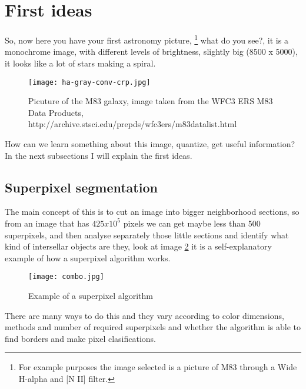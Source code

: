 \documentclass[11pt,fleqn]{book} %
\begin{document}
\section{First ideas}
So, now here you have your first astronomy picture, \footnote{For example purposes the image selected is a picture of M83 through a Wide H-alpha and [N II] filter. } what do you see?, it is a monochrome image, with different levels of brightness, slightly big (8500 x 5000), it looks like a lot of stars making a spiral.
\begin{figure}[h]
    \centering
        \texttt{[image: ha-gray-conv-crp.jpg]}
	    \caption{Picuture of the M83 galaxy, image taken from the WFC3 ERS M83 Data Products, http://archive.stsci.edu/prepds/wfc3ers/m83datalist.html}
	        \label{fig:awesome_image}
		\end{figure}

		How can we learn something about this image, quantize, get useful information? In the next subsections I will explain the first ideas.

		\subsection{Superpixel segmentation}
		The main concept of this is to cut an image into bigger neighborhood sections, so from an image that has $425x10^5$ pixels we can get maybe less than 500 superpixels, and then analyse separately those little sections and identify what kind of intersellar objects are they, look at image \ref{fig:super} it is a self-explanatory example of how a superpixel algorithm works.
		\begin{figure}[h]
		    \centering
		        \texttt{[image: combo.jpg]}
			    \caption{Example of a superpixel algorithm}
			        \label{fig:super}
				\end{figure}
				There are many ways to do this and they vary according to color dimensions, methods and number of required superpixels and whether the algorithm is able to find borders and make pixel clasifications.
\end{document}
